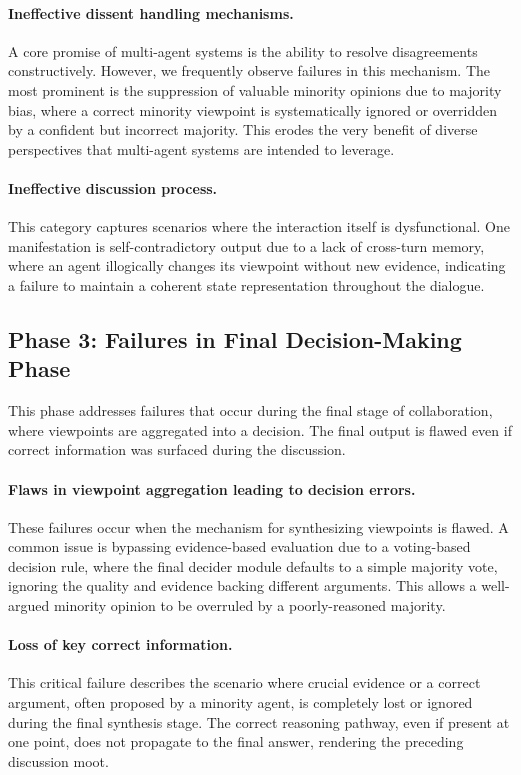 \documentclass{article}
\begin{document}
\paragraph{Ineffective dissent handling mechanisms.}
A core promise of multi-agent systems is the ability to resolve disagreements constructively. However, we frequently observe failures in this mechanism. The most prominent is the suppression of valuable minority opinions due to majority bias, where a correct minority viewpoint is systematically ignored or overridden by a confident but incorrect majority. This erodes the very benefit of diverse perspectives that multi-agent systems are intended to leverage.

\paragraph{Ineffective discussion process.}
This category captures scenarios where the interaction itself is dysfunctional. One manifestation is self-contradictory output due to a lack of cross-turn memory, where an agent illogically changes its viewpoint without new evidence, indicating a failure to maintain a coherent state representation throughout the dialogue.

\subsection{Phase 3: Failures in Final Decision-Making Phase}
This phase addresses failures that occur during the final stage of collaboration, where viewpoints are aggregated into a decision. The final output is flawed even if correct information was surfaced during the discussion.

\paragraph{Flaws in viewpoint aggregation leading to decision errors.}
These failures occur when the mechanism for synthesizing viewpoints is flawed. A common issue is bypassing evidence-based evaluation due to a voting-based decision rule, where the final decider module defaults to a simple majority vote, ignoring the quality and evidence backing different arguments. This allows a well-argued minority opinion to be overruled by a poorly-reasoned majority.

\paragraph{Loss of key correct information.}
This critical failure describes the scenario where crucial evidence or a correct argument, often proposed by a minority agent, is completely lost or ignored during the final synthesis stage. The correct reasoning pathway, even if present at one point, does not propagate to the final answer, rendering the preceding discussion moot.
\end{document}
